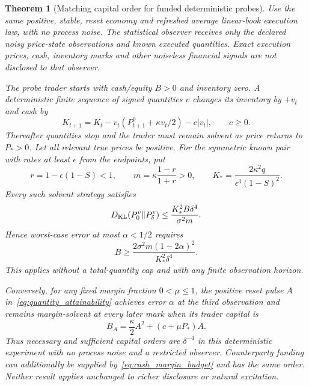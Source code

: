 \documentclass[11pt]{article}
\newtheorem{theorem}{Theorem}[section]\newtheorem{proposition}[theorem]{Proposition}\newtheorem{lemma}[theorem]{Lemma}
\begin{document}
\begin{theorem}[Matching capital order for funded deterministic probes]
\label{thm:trader_capital_frontier}
Use the same positive, stable, reset economy and refreshed average linear-book execution law, with no process noise. The statistical observer receives only the declared noisy price-state observations and known executed quantities. Exact execution prices, cash, inventory marks and other noiseless financial signals are not disclosed to that observer.

The probe trader starts with cash/equity $B>0$ and inventory zero. A deterministic finite sequence of signed quantities $v$ changes its inventory by $+v_t$ and cash by
\[
K_{t+1}=K_t-v_t(P^0_{t+1}+\kappa v_t/2)-c|v_t|,
\qquad c\ge0.
\]
Thereafter quantities stop and the trader must remain solvent as price returns to $P_*>0$. Let all relevant true prices be positive. For the symmetric known pair with rates at least $\epsilon$ from the endpoints, put
\[
r=1-\epsilon(1-S)<1,\qquad
m=\kappa\frac{1-r}{1+r}>0,
\qquad K_*=\frac{2\kappa^2q}{\epsilon^3(1-S)^2}.
\]
Every such solvent strategy satisfies
\begin{equation}
D_{\rm KL}(P_0^v\|P_\delta^v)
\le \frac{K_*^2B\delta^4}{\sigma^2m}.
\label{eq:trader_capital_information}
\end{equation}
Hence worst-case error at most $\alpha<1/2$ requires
\begin{equation}
B\ge\frac{2\sigma^2m(1-2\alpha)^2}{K_*^2\delta^4}.
\label{eq:capital_lower_order}
\end{equation}
This applies without a total-quantity cap and with any finite observation horizon.

Conversely, for any fixed margin fraction $0<\mu\le1$, the positive reset pulse $A$ in~\eqref{eq:quantity_attainability} achieves error $\alpha$ at the third observation and remains margin-solvent at every later mark when its trader capital is
\begin{equation}
B_A=\frac\kappa2A^2+(c+\mu P_*)A.
\label{eq:trader_pulse_capital}
\end{equation}
Thus necessary and sufficient capital orders are $\delta^{-4}$ in this deterministic experiment with no process noise and a restricted observer. Counterparty funding can additionally be supplied by~\eqref{eq:cash_margin_budget} and has the same order. Neither result applies unchanged to richer disclosure or natural excitation.
\end{theorem}
\end{document}

